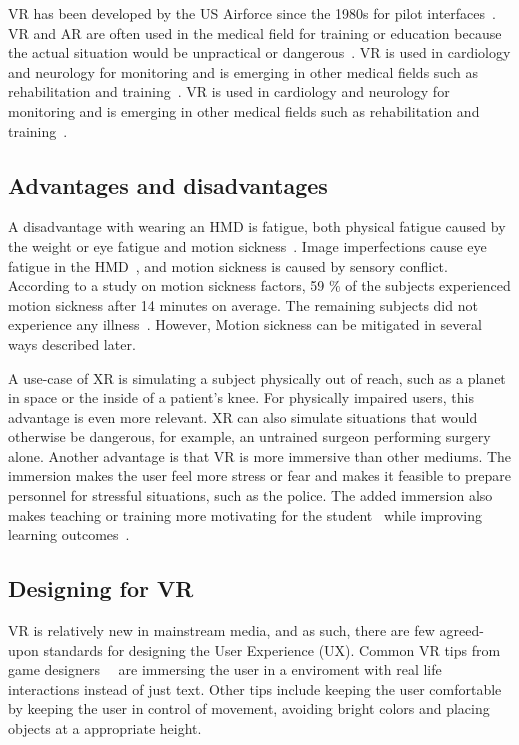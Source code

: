 \documentclass[a4paper]{report}
\begin{document}
VR has been developed by the US Airforce since the 1980s for pilot interfaces~\cite{mertz_virtual_2019}. VR and AR are often used in the medical field for training or education because the actual situation would be unpractical or dangerous~\cite{freina_immersive_2015}.
VR is used in cardiology and neurology for monitoring and is emerging in other medical fields such as rehabilitation and training~\cite{javaid_virtual_2020}.
VR is used in cardiology and neurology for monitoring and is emerging in other medical fields such as rehabilitation and training~\cite{javaid_virtual_2020}.


\subsection{Advantages and disadvantages}
A disadvantage with wearing an HMD is fatigue, both physical fatigue caused by the weight or eye fatigue and motion sickness~\cite{merhi_motion_2007}.
Image imperfections cause eye fatigue in the HMD~\cite{kooi_visual_2004}, and motion sickness is caused by sensory conflict.
According to a study on motion sickness factors, 59 \% of the subjects experienced motion sickness after 14 minutes on average. The remaining subjects did not experience any illness~\cite{kooi_visual_2004}. However, Motion sickness can be mitigated in several ways described later.

A use-case of XR is simulating a subject physically out of reach, such as a planet in space or the inside of a patient's knee. For physically impaired users, this advantage is even more relevant.
XR can also simulate situations that would otherwise be dangerous, for example, an untrained surgeon performing surgery alone.
Another advantage is that VR is more immersive than other mediums. The immersion makes the user feel more stress or fear and makes it feasible to prepare personnel for stressful situations, such as the police.
The added immersion also makes teaching or training more motivating for the student~\cite{freina_immersive_2015} while improving learning outcomes~\cite{cynthia_l_foronda_virtual_nodate}.

\subsection{Designing for VR}
VR is relatively new in mainstream media, and as such, there are few agreed-upon standards for designing the User Experience (UX).
Common VR tips from game designers~\cite{vrdesign_best_nodate}~\cite{vrdesignadobe_virtual_nodate} are immersing the user in a enviroment with real life interactions instead of just text. Other tips include keeping the user comfortable by keeping the user in control of movement, avoiding bright colors and placing objects at a appropriate height.
\end{document}
